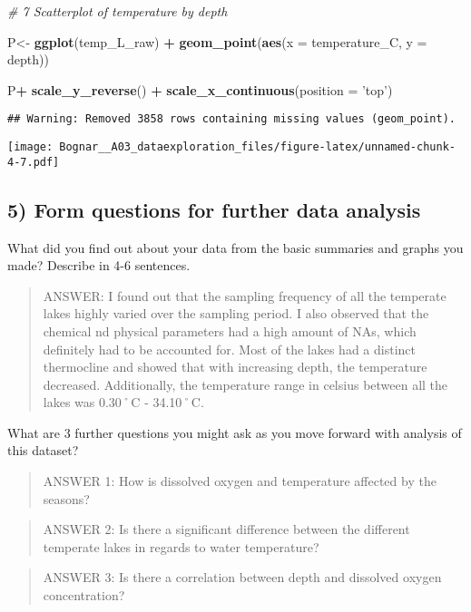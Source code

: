 \documentclass[]{article}
\newenvironment{Shaded}{\begin{snugshade}}{\end{snugshade}}
\newcommand{\KeywordTok}[1]{\textcolor[rgb]{0.13,0.29,0.53}{\textbf{#1}}}
\newcommand{\DataTypeTok}[1]{\textcolor[rgb]{0.13,0.29,0.53}{#1}}
\newcommand{\StringTok}[1]{\textcolor[rgb]{0.31,0.60,0.02}{#1}}
\newcommand{\CommentTok}[1]{\textcolor[rgb]{0.56,0.35,0.01}{\textit{#1}}}
\newcommand{\OperatorTok}[1]{\textcolor[rgb]{0.81,0.36,0.00}{\textbf{#1}}}
\newcommand{\NormalTok}[1]{#1}
\begin{document}
\begin{Shaded}
\begin{Highlighting}[]
\CommentTok{# 7 Scatterplot of temperature by depth}

\NormalTok{P<-}\StringTok{ }\KeywordTok{ggplot}\NormalTok{(temp_L_raw) }\OperatorTok{+}
\StringTok{  }\KeywordTok{geom_point}\NormalTok{(}\KeywordTok{aes}\NormalTok{(}\DataTypeTok{x =}\NormalTok{ temperature_C, }\DataTypeTok{y =}\NormalTok{ depth))}

\NormalTok{P}\OperatorTok{+}\StringTok{ }\KeywordTok{scale_y_reverse}\NormalTok{() }\OperatorTok{+}\StringTok{ }\KeywordTok{scale_x_continuous}\NormalTok{(}\DataTypeTok{position =} \StringTok{'top'}\NormalTok{)}
\end{Highlighting}
\end{Shaded}

\begin{verbatim}
## Warning: Removed 3858 rows containing missing values (geom_point).
\end{verbatim}

\texttt{[image: Bognar\_\_A03\_dataexploration\_files/figure-latex/unnamed-chunk-4-7.pdf]}

\subsection{5) Form questions for further data
analysis}\label{form-questions-for-further-data-analysis}

What did you find out about your data from the basic summaries and
graphs you made? Describe in 4-6 sentences.

\begin{quote}
ANSWER: I found out that the sampling frequency of all the temperate
lakes highly varied over the sampling period. I also observed that the
chemical nd physical parameters had a high amount of NAs, which
definitely had to be accounted for. Most of the lakes had a distinct
thermocline and showed that with increasing depth, the temperature
decreased. Additionally, the temperature range in celsius between all
the lakes was 0.30˚C - 34.10˚C.
\end{quote}

What are 3 further questions you might ask as you move forward with
analysis of this dataset?

\begin{quote}
ANSWER 1: How is dissolved oxygen and temperature affected by the
seasons?
\end{quote}

\begin{quote}
ANSWER 2: Is there a significant difference between the different
temperate lakes in regards to water temperature?
\end{quote}

\begin{quote}
ANSWER 3: Is there a correlation between depth and dissolved oxygen
concentration?
\end{quote}
\end{document}
